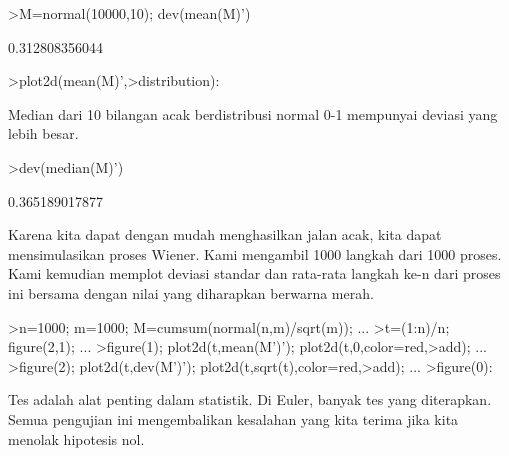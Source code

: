 \documentclass[a4paper,10pt]{article}
\begin{document}
\begin{eulernotebook}
\begin{eulercomment}
\begin{eulercomment}
\begin{eulerprompt}
>M=normal(10000,10); dev(mean(M)')
\end{eulerprompt}
\begin{euleroutput}
  0.312808356044
\end{euleroutput}
\begin{eulerprompt}
>plot2d(mean(M)',>distribution):
\end{eulerprompt}
\begin{eulercomment}
Median dari 10 bilangan acak berdistribusi normal 0-1 mempunyai
deviasi yang lebih besar.
\end{eulercomment}
\begin{eulerprompt}
>dev(median(M)')
\end{eulerprompt}
\begin{euleroutput}
  0.365189017877
\end{euleroutput}
\begin{eulercomment}
Karena kita dapat dengan mudah menghasilkan jalan acak, kita dapat
mensimulasikan proses Wiener. Kami mengambil 1000 langkah dari 1000
proses. Kami kemudian memplot deviasi standar dan rata-rata langkah
ke-n dari proses ini bersama dengan nilai yang diharapkan berwarna
merah.
\end{eulercomment}
\begin{eulerprompt}
>n=1000; m=1000; M=cumsum(normal(n,m)/sqrt(m)); ...
>t=(1:n)/n; figure(2,1); ...
>figure(1); plot2d(t,mean(M')'); plot2d(t,0,color=red,>add); ...
>figure(2); plot2d(t,dev(M')'); plot2d(t,sqrt(t),color=red,>add); ...
>figure(0):
\end{eulerprompt}
\begin{eulercomment}
Tes adalah alat penting dalam statistik. Di Euler, banyak tes yang
diterapkan. Semua pengujian ini mengembalikan kesalahan yang kita
terima jika kita menolak hipotesis nol.


\end{eulercomment}
\end{eulercomment}
\end{eulercomment}
\end{eulernotebook}
\end{document}
